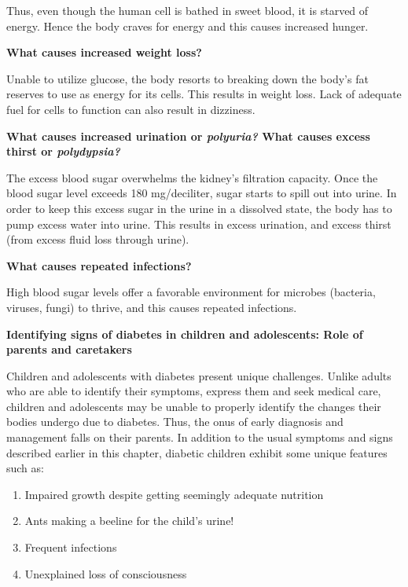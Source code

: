 Thus, even though the human cell is bathed in sweet blood, it is starved of energy. Hence the body craves for energy and this causes increased hunger.

\noindent
\textbf{What causes increased weight loss?}

Unable to utilize glucose, the body resorts to breaking down the body’s fat reserves to use as energy for its cells. This results in weight loss. Lack of adequate fuel for cells to function can also result in dizziness.

\noindent
\textbf{What causes increased urination or \textit{polyuria?} What causes excess thirst or \textit{polydypsia?}}

The excess blood sugar overwhelms the kidney’s filtration capa\-city. Once the blood sugar level exceeds 180 mg/deciliter, sugar starts to spill out into urine. In order to keep this excess sugar in the urine in a dissolved state, the body has to pump excess water into urine. This results in excess urination, and excess thirst (from excess fluid loss through urine).

\noindent
\textbf{What causes repeated infections?}

High blood sugar levels offer a favorable environment for microbes (bacteria, viruses, fungi) to thrive, and this causes repeated infections.

\noindent
\textbf{Identifying signs of diabetes in children and adolescents: Role of parents and caretakers}

Children and adolescents with diabetes present unique challenges. Unlike adults who are able to identify their symptoms, express them and seek medical care, children and adolescents may be unable to pro\-perly identify the changes their bodies undergo due to diabetes. Thus, the onus of early diagnosis and management falls on their parents. In addition to the usual symptoms and signs described earlier in this chapter, diabetic children exhibit some unique features such as:

\begin{enumerate}[\ding{226}]
\itemsep=0pt
\item Impaired growth despite getting seemingly adequate nutrition
\item Ants making a beeline for the child’s urine!
\item Frequent infections
\item Unexplained loss of consciousness
\end{enumerate}

